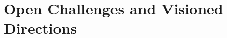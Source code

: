 \documentclass[conference]{IEEEtran}
\begin{document}







\section{Open Challenges and Visioned Directions}

\end{document}
